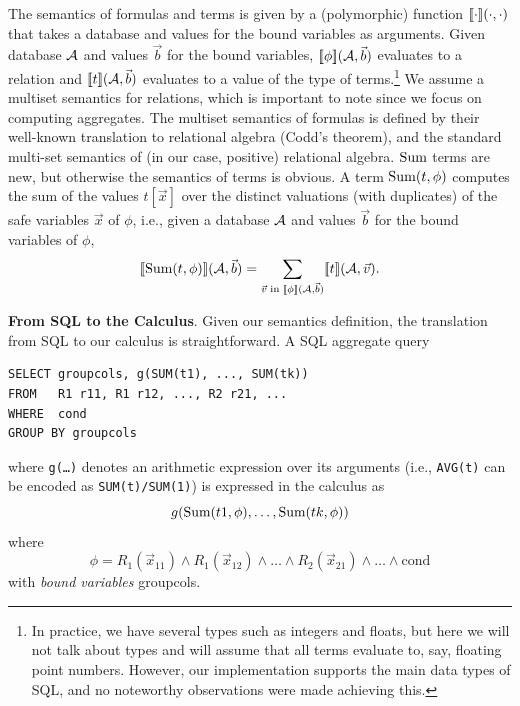 The semantics of formulas and terms is given by a (polymorphic) function
$\lbrack\!\lbrack\cdot\rbrack\!\rbrack(\cdot, \cdot)$ that takes a database and values for the
bound variables as arguments. Given database $\db$ and values $\vec{b}$ for
the bound variables,
$\Bracks{\phi}(\db, \vec{b})$ evaluates to a relation and
$\Bracks{t}(\db, \vec{b})$ evaluates to a value of the type of
terms.\footnote{In practice,
we have several types such as integers and floats, but
here we will not talk about types and will assume that all terms evaluate to,
say, floating point numbers. However, our implementation supports the
main data types of SQL, and no noteworthy observations were made achieving
this.}
We assume a multiset semantics for relations, which is important to note
since we focus on computing aggregates. The multiset semantics of formulas
is defined by their well-known translation to relational algebra
(Codd's theorem), and the standard multi-set semantics of
(in our case, positive) relational algebra. 
$\mbox{Sum}$ terms are new, but otherwise the
semantics of terms is obvious.
A term $\mbox{Sum}(t, \phi)$
computes the sum of the values $t[\vec{x}]$
over the distinct valuations (with duplicates)
of the safe variables $\vec{x}$ of $\phi$, i.e.,
given a database $\db$ and values $\vec{b}$ for the bound variables of $\phi$,
\[
\Bracks{\AggSum(t, \phi)}(\db, \vec{b}) =
\sum_{\vec{v} \;\mathrm{in}\; \Bracks{\phi}(\db, \vec{b})} \Bracks{t}(\db, \vec{v}).
\]


{\bf From SQL to the Calculus}.
Given our semantics definition, the translation from SQL to our calculus is
straightforward.
%
%
A SQL aggregate query
\begin{verbatim}
SELECT groupcols, g(SUM(t1), ..., SUM(tk))
FROM   R1 r11, R1 r12, ..., R2 r21, ...
WHERE  cond
GROUP BY groupcols
\end{verbatim}
where {\tt g(\dots)} denotes an arithmetic expression
over its arguments (i.e., {\tt AVG(t)} can be encoded as {\tt SUM(t)/SUM(1)})
is expressed in the calculus as
\[
g(\mbox{Sum}(t1, \phi), \dots, \mbox{Sum}(tk, \phi))
\]
where
\[
\phi = R_1(\vec{x}_{11}) \land R_1(\vec{x}_{12}) \land \dots
\land R_2(\vec{x}_{21}) \land \dots \land \mbox{cond}
\]
with {\em bound variables} groupcols.


